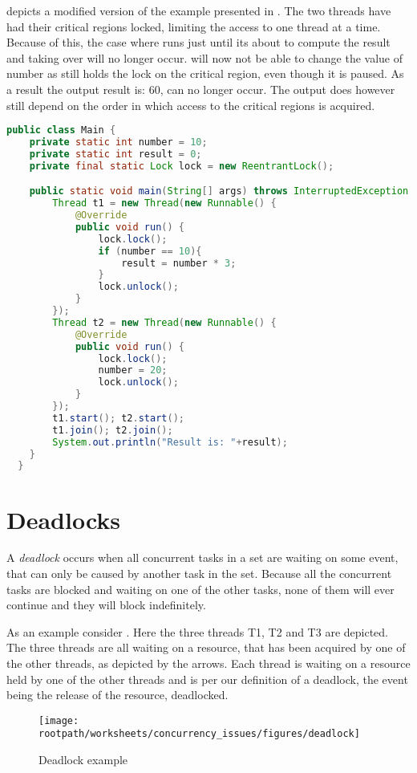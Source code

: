  depicts a modified version of the example presented in . The two threads have had their critical regions locked, limiting the access to one thread at a time. Because of this, the case where  runs just until its about to compute the result and   taking over will no longer occur.  will now not be able to change the value of number as  still holds the lock on the critical region, even though it is paused. As a result the output result is: 60, can no longer occur. The output does however still depend on the order in which access to the critical regions is acquired.
\begin{lstlisting}[float,label=lst:mutualexclusion,
  caption={Mutual exclusion in Java using a lock},
  language=Java,  
  showspaces=false,
  showtabs=false,
  breaklines=true,
  showstringspaces=false,
  breakatwhitespace=true,
  commentstyle=\color{greencomments},
  keywordstyle=\color{bluekeywords},
  stringstyle=\color{redstrings}]  % Start your code-block
public class Main {
	private static int number = 10;
    private static int result = 0;
    private final static Lock lock = new ReentrantLock();

    public static void main(String[] args) throws InterruptedException {
        Thread t1 = new Thread(new Runnable() {
            @Override
            public void run() {
                lock.lock();
                if (number == 10){
                    result = number * 3;
                }
                lock.unlock();
            }
        });
        Thread t2 = new Thread(new Runnable() {
            @Override
            public void run() {
                lock.lock();
                number = 20;
                lock.unlock();
            }
        });
        t1.start(); t2.start();
        t1.join(); t2.join();
        System.out.println("Result is: "+result);
    }
  }
\end{lstlisting}
 
\section{Deadlocks}
A \emph{deadlock} occurs when all concurrent tasks in a set are waiting on some event, that can only be caused by another task in the set\cite[p. 435]{tanenbaum2008modern}. Because all the concurrent tasks are blocked and waiting on one of the other tasks, none of them will ever continue and they will block indefinitely.

As an example consider . Here the three threads T1, T2 and T3 are depicted. The three threads are all waiting on a resource, that has been acquired by one of the other threads, as depicted by the arrows. Each thread is waiting on a resource held by one of the other threads and is per our definition of a deadlock, the event being the release of the resource, deadlocked.
\begin{figure}[htbp]
\centering
 \texttt{[image: \\rootpath/worksheets/concurrency\_issues/figures/deadlock]} 
 \caption{Deadlock example}
\label{fig:deadlockexample}
\end{figure}


